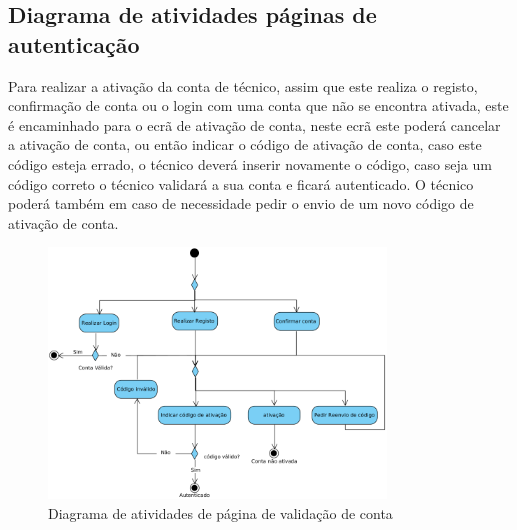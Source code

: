 \newpage

\subsection{Diagrama de atividades páginas de autenticação}

Para realizar a ativação da conta de técnico, assim que este realiza o registo, confirmação de conta ou 
o login com uma conta que não se encontra ativada, este é encaminhado para o ecrã de 
ativação de conta, neste ecrã este poderá cancelar a ativação de conta, ou então indicar o código 
de ativação de conta, caso este código esteja errado, o técnico deverá inserir novamente o código, 
caso seja um código correto o técnico validará a sua conta e ficará autenticado. O técnico poderá 
também em caso de necessidade pedir o envio de um novo código de ativação de conta.

\begin{figure}[htb]
    \centering
    \includegraphics[width=0.8\textwidth]{images/diagramas/atividades/diagrama_atividades_autenticação.png}
    \caption{Diagrama de atividades de página de validação de conta}
    \label{fig:39}
\end{figure}

\newpage



